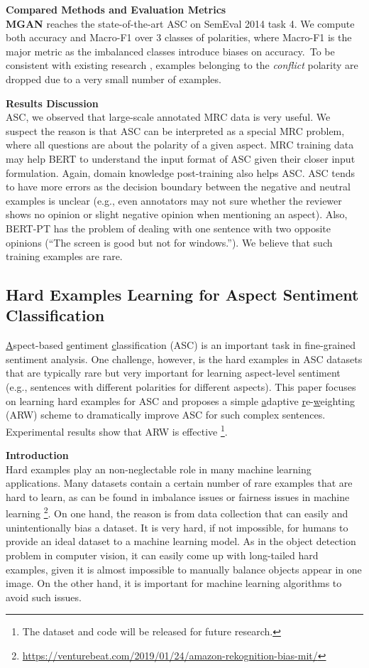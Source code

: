 \textbf{Compared Methods and Evaluation Metrics}\\
\textbf{MGAN} \cite{li2018exploiting} reaches the state-of-the-art ASC on SemEval 2014 task 4.
We compute both accuracy and Macro-F1 over 3 classes of polarities, where Macro-F1 is the major metric as the imbalanced classes introduce biases on accuracy.~To be consistent with existing research \cite{tang2016aspect}, examples belonging to the \textit{conflict} polarity are dropped due to a very small number of examples.


\textbf{Results Discussion}\\
ASC, we observed that large-scale annotated MRC data is very useful.
We suspect the reason is that ASC can be interpreted as a special MRC problem, where all questions are about the polarity of a given aspect.
MRC training data may help BERT to understand the input format of ASC given their closer input formulation.
Again, domain knowledge post-training also helps ASC.
ASC tends to have more errors as the decision boundary between the negative and neutral examples is unclear (e.g., even annotators may not sure whether the reviewer shows no opinion or slight negative opinion when mentioning an aspect).
Also, BERT-PT has the problem of dealing with one sentence with two opposite opinions (``The screen is good but not for windows.''). We believe that such training examples are rare.


\subsection{Hard Examples Learning for Aspect Sentiment Classification}

\underline{A}spect-based \underline{s}entiment \underline{c}lassification (ASC) is an important task in fine-grained sentiment analysis.
One challenge, however, is the hard examples in ASC datasets that are typically rare but very important for learning aspect-level sentiment (e.g., sentences with different polarities for different aspects).
This paper focuses on learning hard examples for ASC and proposes a simple \underline{a}daptive \underline{r}e-\underline{w}eighting (ARW) scheme to dramatically improve ASC for such complex sentences. Experimental results show that ARW is effective \footnote{The dataset and code will be released for future research.}.


\textbf{Introduction}\\
Hard examples play an non-neglectable role in many machine learning applications.
Many datasets contain a certain number of rare examples that are hard to learn, as can be found in imbalance issues or fairness issues in machine learning \footnote{\url{https://venturebeat.com/2019/01/24/amazon-rekognition-bias-mit/}}.
On one hand, the reason is from data collection that can easily and unintentionally bias a dataset.
It is very hard, if not impossible, for humans to provide an ideal dataset to a machine learning model.
As in the object detection problem \cite{shrivastava2016training,lin2017focal} in computer vision, it can easily come up with long-tailed hard examples, given it is almost impossible to manually balance objects appear in one image.
On the other hand, it is important for machine learning algorithms to avoid such issues. 

